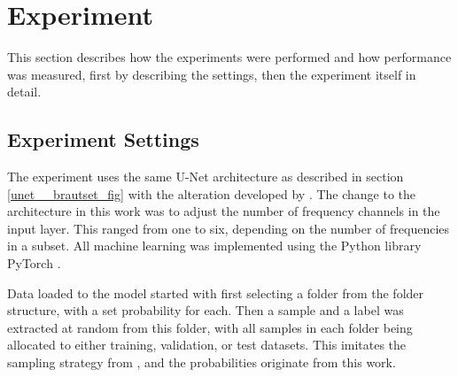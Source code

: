 \section{Experiment} \label{Experiment}
    This section describes how the experiments were performed and how performance was measured, first by describing the settings, then the experiment itself in detail.
    
    \subsection{Experiment Settings} \label{Experiment settings}
        The experiment uses the same U-Net architecture as described in section \ref{unet__brautset_fig} with the alteration developed by \citeauthor{brautaset2020acoustic} \cite{brautaset2020acoustic}. The change to the architecture in this work was to adjust the number of frequency channels in the input layer. This ranged from one to six, depending on the number of frequencies in a subset. All machine learning was implemented using the Python library PyTorch \cite{NEURIPS2019_9015}. %
        
        Data loaded to the model started with first selecting a folder from the folder structure, with a set probability for each. Then a sample and a label was extracted at random from this folder, with all samples in each folder being allocated to either training, validation, or test datasets. This imitates the sampling strategy from \citeauthor{brautaset2020acoustic} \cite{brautaset2020acoustic}, and the probabilities originate from this work.
        
